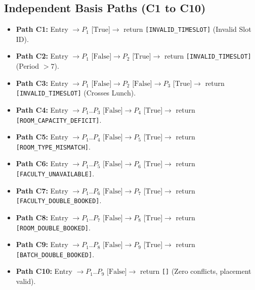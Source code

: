 \documentclass[11pt,a4paper]{article}
\begin{document}
\subsection{Independent Basis Paths (C1 to C10)}
\begin{itemize}
    \item \textbf{Path C1:} Entry $\to P_1 \text{ [True]} \to$ return \texttt{[INVALID\_TIMESLOT]} (Invalid Slot ID).
    \item \textbf{Path C2:} Entry $\to P_1 \text{ [False]} \to P_2 \text{ [True]} \to$ return \texttt{[INVALID\_TIMESLOT]} (Period $> 7$).
    \item \textbf{Path C3:} Entry $\to P_1 \text{ [False]} \to P_2 \text{ [False]} \to P_3 \text{ [True]} \to$ return \texttt{[INVALID\_TIMESLOT]} (Crosses Lunch).
    \item \textbf{Path C4:} Entry $\to P_1..P_3 \text{ [False]} \to P_4 \text{ [True]} \to$ return \texttt{[ROOM\_CAPACITY\_DEFICIT]}.
    \item \textbf{Path C5:} Entry $\to P_1..P_4 \text{ [False]} \to P_5 \text{ [True]} \to$ return \texttt{[ROOM\_TYPE\_MISMATCH]}.
    \item \textbf{Path C6:} Entry $\to P_1..P_5 \text{ [False]} \to P_6 \text{ [True]} \to$ return \texttt{[FACULTY\_UNAVAILABLE]}.
    \item \textbf{Path C7:} Entry $\to P_1..P_6 \text{ [False]} \to P_7 \text{ [True]} \to$ return \texttt{[FACULTY\_DOUBLE\_BOOKED]}.
    \item \textbf{Path C8:} Entry $\to P_1..P_7 \text{ [False]} \to P_8 \text{ [True]} \to$ return \texttt{[ROOM\_DOUBLE\_BOOKED]}.
    \item \textbf{Path C9:} Entry $\to P_1..P_8 \text{ [False]} \to P_9 \text{ [True]} \to$ return \texttt{[BATCH\_DOUBLE\_BOOKED]}.
    \item \textbf{Path C10:} Entry $\to P_1..P_9 \text{ [False]} \to$ return \texttt{[]} (Zero conflicts, placement valid).
\end{itemize}
\end{document}
